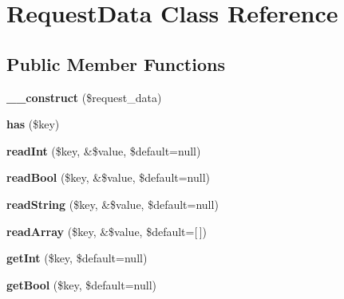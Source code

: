 \hypertarget{class_request_data}{}\section{Request\+Data Class Reference}
\label{class_request_data}
\subsection*{Public Member Functions}
\begin{DoxyCompactItemize}
\item 
\mbox{\label{class_request_data_a669382ca8209546c1fc5b69805e246b8}} 
{\bfseries \+\_\+\+\_\+construct} (\$request\+\_\+data)
\item 
\mbox{\label{class_request_data_a8b23dbb48f0c3c94725695191d06981a}} 
{\bfseries has} (\$key)
\item 
\mbox{\label{class_request_data_afc5fb78e5e7b38a63f47c60d59b76083}} 
{\bfseries read\+Int} (\$key, \&\$value, \$default=null)
\item 
\mbox{\label{class_request_data_a4195c2ac041f755cc109d09db8ca856f}} 
{\bfseries read\+Bool} (\$key, \&\$value, \$default=null)
\item 
\mbox{\label{class_request_data_ac63931fd6da0fd43e2a5ec496d5dfec5}} 
{\bfseries read\+String} (\$key, \&\$value, \$default=null)
\item 
\mbox{\label{class_request_data_a829933c7b0b8ddb5c59e7e23b1bb970d}} 
{\bfseries read\+Array} (\$key, \&\$value, \$default=\mbox{[}$\,$\mbox{]})
\item 
\mbox{\label{class_request_data_aa66e1367f11839054f97149dbfdddc12}} 
{\bfseries get\+Int} (\$key, \$default=null)
\item 
\mbox{\label{class_request_data_a19e53a2778353bd321daf84c70131a09}} 
{\bfseries get\+Bool} (\$key, \$default=null)
\item 
\mbox{\label{class_request_data_a05d694eeb9f165bd8e0245c06a34a807}} 

\end{DoxyCompactItemize}
